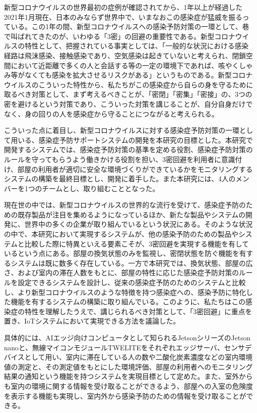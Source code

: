 新型コロナウイルスの世界最初の症例が確認されてから、1年以上が経過した2021年1月現在、日本のみならず世界中で、いまなおこの感染症が猛威を振るっている。この1年の間、新型コロナウイルスへの感染予防対策の一環として、巷で叫ばれてきたのが、いわゆる「3密」の回避の重要性である。新型コロナウイルスの特性として、把握されている事実としては、「一般的な状況における感染経路は飛沫感染、接触感染であり、空気感染は起きていないと考えられ、閉鎖空間において近距離で多くの人と会話する等の一定の環境下であれば、咳やくしゃみ等がなくても感染を拡大させるリスクがある\cite{housin}」というものである。新型コロナウイルスのこういった特性から、私たちがこの感染症から自らの身を守るために取るべき対策として、まず考えるべきことが、「密閉」「密集」「密接」の、3つの密を避けるという対策であり、こういった対策を講じることが、自分自身だけでなく、身の回りの人を感染症から守ることにつながると考えられる。

こういった点に着目し、新型コロナウイルスに対する感染症予防対策の一環として用いる、感染症予防サポートシステムの開発を本研究の目標とした。本研究で開発するシステムでは、感染症予防対策の基準を定める役割、感染症予防対策のルールを守ってもらうよう働きかける役割を担い、3密回避を利用者に意識付け、部屋の利用者が適切に安全な環境づくりができているかをモニタリングするシステムの構築を最終目標とし、開発に着手した。また本研究には、4人のメンバーを1つのチームとし、取り組むこととなった。

現在世の中では、新型コロナウイルスの世界的な流行を受けて、感染症予防のための既存製品が注目を集めるようになっているほか、新たな製品やシステムの開発に、世界中の多くの企業が取り組んでいるという状況にある。そのような状況の中で、本研究において実現するシステムが、他の感染予防のための製品やシステムと比較した際に特異といえる要素こそが、3密回避を実現する機能を有しているという点にある。部屋の換気状態のみを監視し、密閉状態を防ぐ機能を有するシステムは既に数多く存在している。一方で本研究では、換気状態、部屋の広さ、および室内の滞在人数をもとに、部屋の特性に応じた感染症予防対策のルールを設定できるシステムを設計し、従来の感染症予防のためのシステムと比較し、より新型コロナウイルスのような特徴を持つ感染症への、感染予防に特化した機能を有するシステムの構築に取り組んでいる。このように、私たちはこの感染症の特性を理解したうえで、講じられるべき対策として、「3密回避」に重点を置き、IoTシステムにおいて実現できる方法を議論した。

具体的には、AIエッジ向けコンピュータとして知られるJetsonシリーズのJetson nanoと、無線マイコンモジュールTWELITEをそれぞれエッジサーバ、センサデバイスとして用い、室内に滞在している人の数や二酸化炭素濃度などの室内環境値の測定と、その測定値をもとにした環境評価、部屋の利用者へのモニタリング結果の通知という機能を持つシステムを実現目標として定めた。また、室外からも室内の環境に関する情報を受け取ることができるよう、部屋への入室の危険度を表示する機能も実現し、室内外から感染予防のための情報を受け取ることができる。

